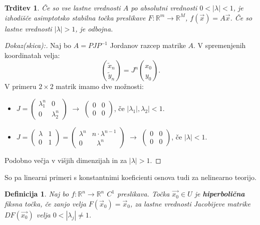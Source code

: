 \documentclass{article}
\newtheorem{definicija}{Definicija}
\newtheorem{trditev}{Trditev}
\newcommand{\R}{\mathbb{R}}
\begin{document}
\begin{trditev}
Če so vse lastne vrednosti $A$ po absolutni vrednosti $0 < |\lambda|< 1$,
je izhodišče asimptotsko stabilna točka preslikave $F: \R^m \rightarrow \R^M$, 
$f(\vec{x}) = A\vec{x}$. Če so lastne vrednosti $|\lambda| > 1$, je 
odbojna.
\end{trditev}

\begin{proof}[Dokaz(skica):]

Naj bo $A = P J P^{-1}$ Jordanov razcep matrike $A$. V spremenjenih 
koordinatah velja:
$$\binom{\tilde{x}_n}{\tilde{y}_n} = J^n \binom{x_0}{y_0}.$$
V primeru $2\times 2$ matrik imamo dve možnosti:
\begin{itemize}
    \item $J = \left(\begin{array}{ll}
    \lambda_1^n & 0 \\ 
    0 & \lambda_2^n
    \end{array}\right)$ $\longrightarrow$ 
    $\left(\begin{array}{ll}
        0 & 0 \\ 
        0 & 0
        \end{array}\right)$, če $|\lambda_1|, \lambda_2| < 1$.
    \item $J = \left(\begin{array}{ll}
    \lambda & 1 \\
    0 & 1
    \end{array}\right) = \left(\begin{array}{ll}
        \lambda^n & n\cdot \lambda^{n-1} \\
        0 & \,\,\,\,\lambda^n
        \end{array}\right)$  $\longrightarrow$
    $\left(\begin{array}{ll}
        0 & 0 \\ 
        0 & 0
        \end{array}\right)$, če $|\lambda| < 1$.
\end{itemize}
Podobno večja v višjih dimenzijah in za $|\lambda| > 1$.
\end{proof}

So pa linearni primeri s konstantnimi koeficienti osnova tudi za 
nelinearno teorijo.

\begin{definicija}
Naj bo $f: \R^n \rightarrow \R^n$ $C^1$ preslikava. Točka $\vec{x_0} \in U$
je \textbf{hiperbolična} fiksna točka, če zanjo velja $F(\vec{x}_0) = \vec{x}_0$, 
za lastne vrednosti Jacobijeve matrike $DF(\vec{x_0})$ velja $0<|\lambda_j| \neq 1$.
\end{definicija}
\end{document}
